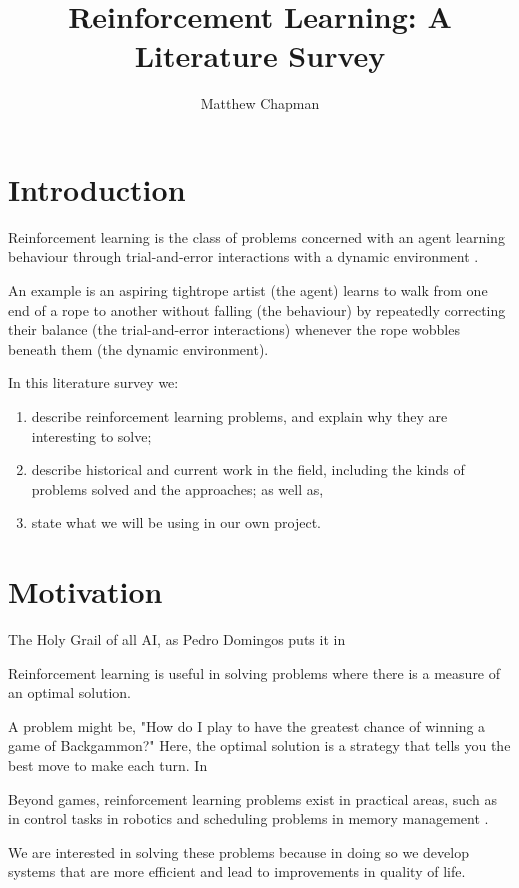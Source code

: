 \documentclass{article}
\title{Reinforcement Learning: A Literature Survey}
\author{Matthew Chapman}
\begin{document}
\maketitle

\section{Introduction}

Reinforcement learning is the class of problems concerned with an agent learning behaviour through trial-and-error interactions with a dynamic
environment \cite{Kaelbling1996}.

An example is an aspiring tightrope artist (the agent) learns to walk
from one end of a rope to another without falling (the behaviour) by
repeatedly correcting their balance (the trial-and-error interactions)
whenever the rope wobbles beneath them (the dynamic environment).

In this literature survey we: 

\begin{enumerate}
  \item{describe reinforcement learning problems, and explain why they are interesting to solve;} 
  \item{describe historical and current work in the field, including the kinds of problems solved and the approaches; as well as,} 
  \item{state what we will be using in our own project.}
\end{enumerate}

\section{Motivation}

The Holy Grail of all AI, as Pedro Domingos puts it in

Reinforcement learning is useful in solving problems where there is a
measure of an optimal solution.

A problem might be, "How do I play to have the greatest chance of winning a game of Backgammon?"
Here, the optimal solution is a strategy that tells you the best move to make each turn. In \cite{}

Beyond games, reinforcement learning problems exist in practical areas,
such as in control tasks in robotics \cite{Kober2013} and scheduling problems in
memory management \cite{Ipek2008}.

We are interested in solving these problems because in doing so we
develop systems that are more efficient and lead to improvements in
quality of life.
\end{document}
